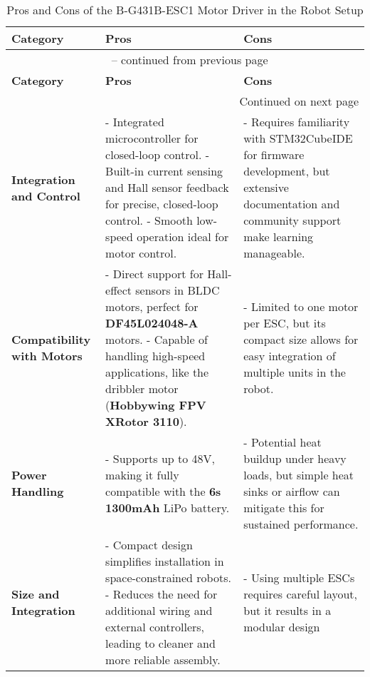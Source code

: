 \documentclass[a4paper,12pt]{article}
\begin{document}
  \begin{longtable}{|p{3cm}|p{6cm}|p{6cm}|}
    \caption{Pros and Cons of the B-G431B-ESC1 Motor Driver in the Robot
      Setup} \\ \hline \textbf{Category} & \textbf{Pros} & \textbf{Cons
    } \\ \hline \endfirsthead

    \multicolumn{3}{c}{{\tablename\ \thetable{} -- continued from
        previous page}} \\ \hline \textbf{Category} & \textbf{Pros} &
    \textbf{Cons} \\ \hline \endhead

    \hline \multicolumn{3}{|r|}{{Continued on next page}} \\ \hline
    \endfoot

    \hline \endlastfoot

    \textbf{Integration and Control} & - Integrated microcontroller for
    closed-loop control. \newline - Built-in current sensing and Hall
    sensor feedback for precise, closed-loop control. \newline - Smooth
    low-speed operation ideal for motor control. & - Requires
    familiarity with STM32CubeIDE for firmware development, but
    extensive documentation and community support make learning
    manageable. \\ \hline \textbf{Compatibility with Motors} & - Direct
    support for Hall-effect sensors in BLDC motors, perfect for
    \textbf{DF45L024048-A} motors. \newline - Capable of handling
    high-speed applications, like the dribbler motor (\textbf{Hobbywing
      FPV XRotor 3110}). & - Limited to one motor per ESC, but its
    compact size allows for easy integration of multiple units in the
    robot. \\ \hline \textbf{Power Handling} & - Supports up to 48V,
    making it fully compatible with the \textbf{6s 1300mAh} LiPo
    battery. \newline & - Potential heat buildup under heavy loads, but
    simple heat sinks or airflow can mitigate this for sustained
    performance. \\ \hline \textbf{Size and Integration} & - Compact
    design simplifies installation in space-constrained robots. \newline
    - Reduces the need for additional wiring and external controllers,
    leading to cleaner and more reliable assembly. & - Using multiple
    ESCs requires careful layout, but it results in a modular design
  \end{longtable}
\end{document}

